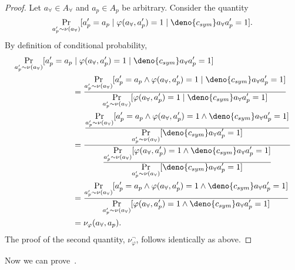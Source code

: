 \documentclass[acmsmall,review,anonymous]{acmart}\settopmatter{printfolios=true,printccs=false,printacmref=false}
\begin{document}
\begin{proof}
  Let $a_{\forall} \in \mathit{A}_{\forall}$ and $a_p \in \mathit{A}_p$ be arbitrary. Consider the quantity
  \[
    \Pr_{a_p' \sim \nu(a_{\forall})}[ a_p' = a_p \mid \varphi(a_{\forall},a_p') = 1 \mid \deno{c_{sym}} a_{\forall} a_p'= 1 ].
  \]
  By definition of conditional probability,
  \begin{align*}
    \Pr_{a_p' \sim \nu(a_{\forall})}[ a_p' = a_p &\mid \varphi(a_{\forall},a_p') = 1 \mid \deno{c_{sym}} a_{\forall} a_p'= 1 ]\\&= \frac{\displaystyle\Pr_{a_p' \sim \nu(a_{\forall})}[a_p' = a_p \wedge \varphi(a_{\forall},a_p') = 1 \mid \deno{c_{sym}} a_{\forall} a_p' = 1 ]}{\displaystyle\Pr_{a_p' \sim \nu(a_{\forall})}[\varphi(a_{\forall},a_p') = 1 \mid \deno{c_{sym}} a_{\forall} a_p' = 1]} \\
                                                                                           &= \frac{\frac{\displaystyle\Pr_{a_p' \sim \nu(a_{\forall})}[a_p' = a_p \wedge \varphi(a_{\forall},a_p') = 1 \wedge \deno{c_{sym}} a_{\forall} a_p' = 1 ]}{\displaystyle\Pr_{a_p' \sim \nu(a_{\forall})}[ \deno{c_{sym}} a_{\forall} a_p' = 1]}}{\frac{\displaystyle\Pr_{a_p' \sim \nu(a_{\forall})}[\varphi(a_{\forall},a_p') = 1 \wedge \deno{c_{sym}} a_{\forall} a_p' = 1 ]}{\displaystyle\Pr_{a_p' \sim \nu(a_{\forall})}[ \deno{c_{sym}} a_{\forall} a_p' = 1]}} \\
                                                                                           &= \frac{\displaystyle\Pr_{a_p' \sim \nu(a_{\forall})}[a_p' = a_p \wedge \varphi(a_{\forall},a_p') = 1 \wedge \deno{c_{sym}} a_{\forall} a_p' = 1 ]}{\displaystyle\Pr_{a_p' \sim \nu(a_{\forall})}[\varphi(a_{\forall},a_p') = 1 \wedge \deno{c_{sym}} a_{\forall} a_p' = 1 ]} \\
                                                                                           &= \nu_{\varphi}(a_{\forall},a_p).
  \end{align*}
  The proof of the second quantity, $\nu_{\varphi}^{\neg}$, follows identically as above.
\end{proof}
Now we can prove~.
\end{document}
